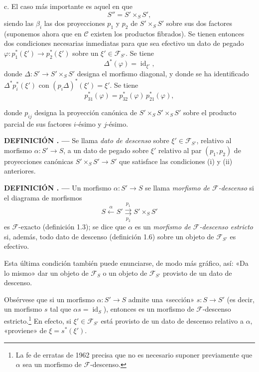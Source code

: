 \documentclass[11pt,twoside,openany]{book}
\numberwithin{equation}{section}
\newcommand{\src}[1]{%
  \phantomsection\hypertarget{src:#1}{}%
  \marginpar{\raggedleft\footnotesize\sffamily #1}%
}
\theoremstyle{plain}
\theoremstyle{definition}
\theoremstyle{remark}
\newcommand{\result}[2]{%
  \par\medskip\noindent\textbf{#1%
  \if\relax\detokenize{#2}\relax\else\space#2\fi. ---}\enspace
}
\newcommand{\FgaUnitKey}{frontmatter}
\renewcommand{\src}[1]{%
  \phantomsection\hypertarget{src:\FgaUnitKey:#1}{}%
  \marginpar{\raggedleft\footnotesize\sffamily #1}%
}
\theoremstyle{plain}
\theoremstyle{definition}
\theoremstyle{remark}
\begin{document}
\medskip\noindent
c. El caso más importante es aquel en que
\[
  S''=S'\times_S S',
\]
siendo las $\beta_i$ las dos proyecciones $p_1$ y $p_2$ de
$S'\times_S S'$ sobre sus dos factores (suponemos ahora que en
$\mathcal C$ existen los productos fibrados). Se tienen entonces dos
condiciones necesarias inmediatas para que sea efectivo un dato de pegado
$\varphi:p_1^*(\xi')\longrightarrow p_2^*(\xi')$ sobre un
$\xi'\in\mathcal F_{S'}$. Se tiene
\[
  \tag{i}
  \Delta^*(\varphi)=\operatorname{id}_{\xi'},
\]
donde $\Delta:S'\longrightarrow S'\times_S S'$ designa el morfismo diagonal,
y donde se ha identificado $\Delta^*p_i^*(\xi')$ con
$(p_i\Delta)^*(\xi')=\xi'$. Se tiene
\[
  \tag{ii}
  p_{31}^*(\varphi)=p_{32}^*(\varphi)\,p_{21}^*(\varphi),
\]

\src{303}
donde $p_{ij}$ designa la proyección canónica de
$S'\times_S S'\times_S S'$ sobre el producto parcial de sus factores
$i$-ésimo y $j$-ésimo.

\result{DEFINICIÓN}{1.6} Se llama \emph{dato de descenso} sobre
$\xi'\in\mathcal F_{S'}$, relativo al morfismo
$\alpha:S'\longrightarrow S$, a un dato de pegado sobre $\xi'$ relativo al par
$(p_1,p_2)$ de proyecciones canónicas
$S'\times_S S'\longrightarrow S'$ que satisface las condiciones (i) y (ii)
anteriores.

\result{DEFINICIÓN}{1.7} Un morfismo $\alpha:S'\longrightarrow S$ se llama
\emph{morfismo de $\mathcal F$-descenso} si el diagrama de morfismos
\[
  S\xleftarrow{\alpha}S'
  \overset{p_1}{\underset{p_2}{\rightrightarrows}}S'\times_S S'
\]
es $\mathcal F$-exacto (definición 1.3); se dice que $\alpha$ es un
\emph{morfismo de $\mathcal F$-descenso estricto} si, además, todo dato de
descenso (definición 1.6) sobre un objeto de $\mathcal F_{S'}$ es efectivo.

Esta última condición también puede enunciarse, de modo más gráfico, así:
«Da lo mismo» dar un objeto de $\mathcal F_S$ o un objeto de
$\mathcal F_{S'}$ provisto de un dato de descenso.

Obsérvese que si un morfismo $\alpha:S'\longrightarrow S$ admite una «sección»
$s:S\longrightarrow S'$ (es decir, un morfismo $s$ tal que
$\alpha s=\operatorname{id}_S$), entonces es un morfismo de
$\mathcal F$-descenso estricto.\footnote{La fe de erratas de 1962 precisa que
no es necesario suponer previamente que $\alpha$ sea un morfismo de
$\mathcal F$-descenso.} En efecto, si $\xi'\in\mathcal F_{S'}$ está provisto de
un dato de descenso relativo a $\alpha$, «proviene» de
$\xi=s^*(\xi')$.
\end{document}

